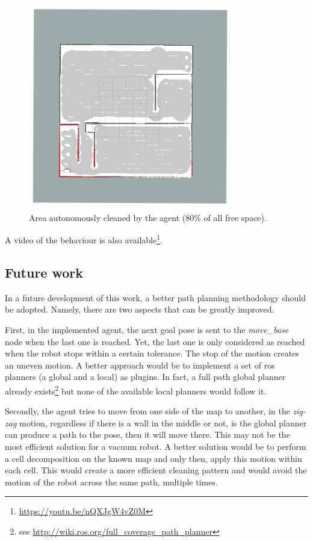 \documentclass[]{article}
\begin{document}
\begin{figure}[ht]
    \centering
    \includegraphics[width=0.8\textwidth]{imgs/map1_cleaned.png}
    \caption{Area autonomously cleaned by the agent (80\% of all free space).}
    \label{fig:map1_cleaned}
\end{figure}

A video of the behaviour is also available\footnote{\url{https://youtu.be/nQXJgW4vZ0M}}.

\subsection{Future work}

In a future development of this work, a better path planning methodology should be adopted. Namely, there are two aspects that can be greatly improved.

First, in the implemented agent, the next goal pose is sent to the \textit{move\_base} node when the last one is reached. Yet, the last one is only considered as reached when the robot stops within a certain tolerance. The stop of the motion creates an uneven motion. A better approach would be to implement a set of \gls{ros} planners (a global and a local) as plugins. In fact, a full path global planner already exists\footnote{see \url{http://wiki.ros.org/full_coverage_path_planner}} but none of the available local planners would follow it.

Secondly, the agent tries to move from one side of the map to another, in the \textit{zig-zag} motion, regardless if there is a wall in the middle or not, is the global planner can produce a path to the pose, then it will move there. This may not be the most efficient solution for a vacuum robot. A better solution would be to perform a cell decomposition on the known map and only then, apply this motion within each cell. This would create a more efficient cleaning pattern and would avoid the motion of the robot across the same path, multiple times.
\end{document}

